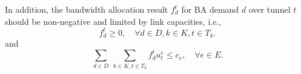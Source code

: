 \documentclass[sigconf]{acmart}
\begin{document}
\begin{appendices}
In addition, the bandwidth allocation result $f_{d}^t$ for BA demand $d$ over tunnel $t$ should be non-negative and limited by link capacities, i.e.,
\begin{equation}
f_{d}^t \ge 0, \quad\forall d \in D ,  k\in K,  t\in T_{k}.
\label{constraint-f}
\end{equation}
and 
\begin{equation}
 \sum_{d \in D}\ \sum_{k\in K, t\in T_{k}}f_{d}^tu_t^e \le c_e, \quad \forall e \in E.
\label{constraint-e}
\end{equation}



\end{appendices}
\end{document}
